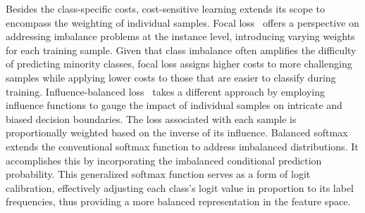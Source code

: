 Besides the class-specific costs, cost-sensitive learning extends its scope to encompass the weighting of individual samples. Focal loss~\cite{lin2017focal} offers a perspective on addressing imbalance problems at the instance level, introducing varying weights for each training sample. Given that class imbalance often amplifies the difficulty of predicting minority classes, focal loss assigns higher costs to more challenging samples while applying lower costs to those that are easier to classify during training. 
Influence-balanced loss~\cite{park2021influence} takes a different approach by employing influence functions to gauge the impact of individual samples on intricate and biased decision boundaries. The loss associated with each sample is proportionally weighted based on the inverse of its influence.
Balanced softmax~\cite{ren2020balanced} extends the conventional softmax function to address imbalanced distributions. It accomplishes this by incorporating the imbalanced conditional prediction probability. This generalized softmax function serves as a form of logit calibration, effectively adjusting each class's logit value in proportion to its label frequencies, thus providing a more balanced representation in the feature space.


